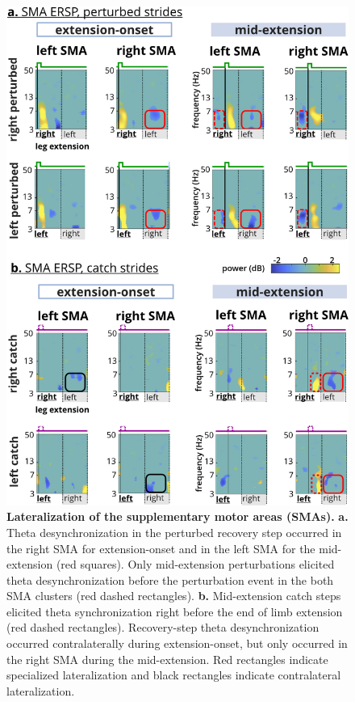 \documentclass[shortpaper,twoside,web]{ieeecolor}
\begin{document}
\begin{figure}[!t]
\centerline{\includegraphics{figures/hyp4- lateraliztion.jpg}}
\caption{\textbf{Lateralization of the supplementary motor areas (SMAs).} \textbf{a.} Theta desynchronization in the perturbed recovery step occurred in the right SMA for extension-onset and in the left SMA for the mid-extension (red squares). Only mid-extension perturbations elicited theta desynchronization before the perturbation event in the both SMA clusters (red dashed rectangles). \textbf{b.} Mid-extension catch steps elicited theta synchronization right before the end of limb extension (red dashed rectangles). Recovery-step theta desynchronization occurred contralaterally during extension-onset, but only occurred in the right SMA during the mid-extension. Red rectangles indicate specialized lateralization and black rectangles indicate contralateral lateralization.}
\label{fig8}
\end{figure}
\end{document}
